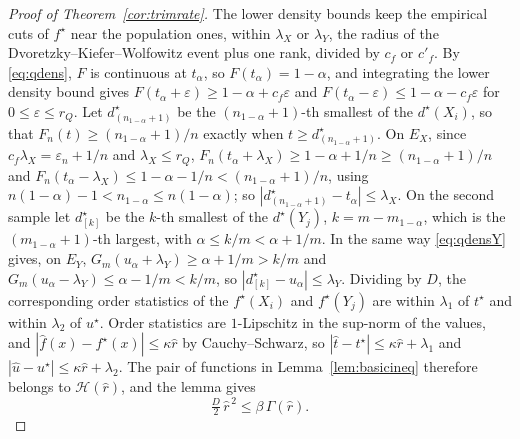 \begin{proof}[Proof of Theorem~\ref{cor:trimrate}]
The lower density bounds keep the empirical cuts of $f^\star$ near the population ones, within $\lambda_X$ or
$\lambda_Y$, the radius of the Dvoretzky--Kiefer--Wolfowitz event plus one rank, divided by $c_f$ or $c'_f$. By \eqref{eq:qdens}, $F$ is continuous at $t_\alpha$, so $F(t_\alpha)=1-\alpha$, and
integrating the lower density bound gives $F(t_\alpha+\varepsilon)\ge1-\alpha+c_f\varepsilon$ and
$F(t_\alpha-\varepsilon)\le1-\alpha-c_f\varepsilon$ for $0\le\varepsilon\le r_Q$. Let $d^\star_{(n_{1-\alpha}+1)}$ be the
$(n_{1-\alpha}+1)$-th smallest of the $d^\star(X_i)$, so that $F_n(t)\ge(n_{1-\alpha}+1)/n$ exactly when $t\ge
d^\star_{(n_{1-\alpha}+1)}$. On $E_X$, since $c_f\lambda_X=\varepsilon_n+1/n$ and $\lambda_X\le r_Q$,
$F_n(t_\alpha+\lambda_X)\ge1-\alpha+1/n\ge(n_{1-\alpha}+1)/n$ and $F_n(t_\alpha-\lambda_X)\le1-\alpha-1/n<(n_{1-\alpha}+1)/n$,
using $n(1-\alpha)-1<n_{1-\alpha}\le n(1-\alpha)$; so $|d^\star_{(n_{1-\alpha}+1)}-t_\alpha|\le\lambda_X$. On the second sample
let $d^\star_{[k]}$ be the $k$-th smallest of the $d^\star(Y_j)$, $k=m-m_{1-\alpha}$, which is the $(m_{1-\alpha}+1)$-th largest,
with $\alpha\le k/m<\alpha+1/m$. In the same way \eqref{eq:qdensY} gives, on $E_Y$, $G_m(u_\alpha+\lambda_Y)\ge
\alpha+1/m>k/m$ and $G_m(u_\alpha-\lambda_Y)\le\alpha-1/m<k/m$, so $|d^\star_{[k]}-u_\alpha|\le\lambda_Y$. Dividing by
$D$, the corresponding order statistics of the $f^\star(X_i)$ and $f^\star(Y_j)$ are within $\lambda_1$ of $t^\star$ and
within $\lambda_2$ of $u^\star$. Order statistics are $1$-Lipschitz in the sup-norm of the values, and
$|\widehat f(x)-f^\star(x)|\le\kappa\widehat r$ by Cauchy--Schwarz, so
$|\widehat t-t^\star|\le\kappa\widehat r+\lambda_1$ and $|\widehat u-u^\star|\le\kappa\widehat r+\lambda_2$. The pair of
functions in Lemma~\ref{lem:basicineq} therefore belongs to $\mathcal H(\widehat r)$, and the lemma gives
\begin{equation}
\tfrac D2\,\widehat r^{\,2}\le\beta\,\Gamma(\widehat r) .
\label{eq:basicZ}
\end{equation}


\end{proof}
